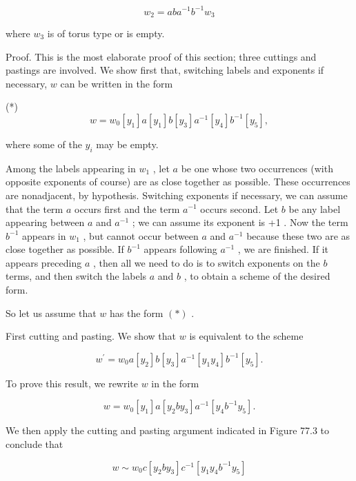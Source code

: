 \documentclass[10pt]{article}
\begin{document}
\[
{w}_{2} = {ab}{a}^{-1}{b}^{-1}{w}_{3}
\]

where \({w}_{3}\) is of torus type or is empty.

Proof. This is the most elaborate proof of this section; three cuttings and pastings are involved. We show first that, switching labels and exponents if necessary, \(w\) can be written in the form

(*)
\[
w = {w}_{0}\left\lbrack  {y}_{1}\right\rbrack  a\left\lbrack  {y}_{1}\right\rbrack  b\left\lbrack  {y}_{3}\right\rbrack  {a}^{-1}\left\lbrack  {y}_{4}\right\rbrack  {b}^{-1}\left\lbrack  {y}_{5}\right\rbrack  ,
\]

where some of the \({y}_{i}\) may be empty.

Among the labels appearing in \({w}_{1}\) , let \(a\) be one whose two occurrences (with opposite exponents of course) are as close together as possible. These occurrences are nonadjacent, by hypothesis. Switching exponents if necessary, we can assume that the term \(a\) occurs first and the term \({a}^{-1}\) occurs second. Let \(b\) be any label appearing between \(a\) and \({a}^{-1}\) ; we can assume its exponent is +1 . Now the term \({b}^{-1}\) appears in \({w}_{1}\) , but cannot occur between \(a\) and \({a}^{-1}\) because these two are as close together as possible. If \({b}^{-1}\) appears following \({a}^{-1}\) , we are finished. If it appears preceding \(a\) , then all we need to do is to switch exponents on the \(b\) terms, and then switch the labels \(a\) and \(b\) , to obtain a scheme of the desired form.

So let us assume that \(w\) has the form \(\left( *\right)\) .

First cutting and pasting. We show that \(w\) is equivalent to the scheme

\[
{w}^{\prime } = {w}_{0}a\left\lbrack  {y}_{2}\right\rbrack  b\left\lbrack  {y}_{3}\right\rbrack  {a}^{-1}\left\lbrack  {{y}_{1}{y}_{4}}\right\rbrack  {b}^{-1}\left\lbrack  {y}_{5}\right\rbrack  .
\]

To prove this result, we rewrite \(w\) in the form

\[
w = {w}_{0}\left\lbrack  {y}_{1}\right\rbrack  a\left\lbrack  {{y}_{2}b{y}_{3}}\right\rbrack  {a}^{-1}\left\lbrack  {{y}_{4}{b}^{-1}{y}_{5}}\right\rbrack  .
\]

We then apply the cutting and pasting argument indicated in Figure 77.3 to conclude that

\[
w \sim  {w}_{0}c\left\lbrack  {{y}_{2}b{y}_{3}}\right\rbrack  {c}^{-1}\left\lbrack  {{y}_{1}{y}_{4}{b}^{-1}{y}_{5}}\right\rbrack
\]
\end{document}
